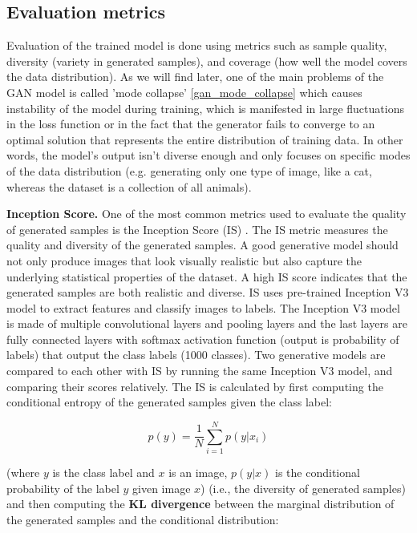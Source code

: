 \subsection{Evaluation metrics}

Evaluation of the trained model is done using metrics such as sample quality, diversity (variety in generated samples), and coverage (how well the model covers the data distribution). As we will find later, one of the main problems of the GAN model is called 'mode collapse' \ref{gan_mode_collapse} which causes instability of the model during training, which is manifested in large fluctuations in the loss function or in the fact that the generator fails to converge to an optimal solution that represents the entire distribution of training data. In other words, the model's output isn't diverse enough and only focuses on specific modes of the data distribution (e.g. generating only one type of image, like a cat, whereas the dataset is a collection of all animals).





\textbf{Inception Score.} One of the most common metrics used to evaluate the quality of generated samples is the Inception Score (IS) \cite{is_score}. The IS metric measures the quality and diversity of the generated samples. A good generative model should not only produce images that look visually realistic but also capture the underlying statistical properties of the dataset. A high IS score indicates that the generated samples are both realistic and diverse. IS uses pre-trained Inception V3 model \cite{inception_v3_model} to extract features and classify images to labels. The Inception V3 model is made of multiple convolutional layers and pooling layers and the last layers are fully connected layers with softmax activation function (output is probability of labels) that output the class labels (1000 classes). Two generative models are compared to each other with IS by running the same Inception V3 model, and comparing their scores relatively. The IS is calculated by first computing the conditional entropy of the generated samples given the class label: 

\[
    p(y) = \frac{1}{N} \sum_{i=1}^{N} p(y|x_i)
\] 

(where $y$ is the class label and $x$ is an image, $p(y|x)$ is the conditional probability of the label $y$ given image $x$) (i.e., the diversity of generated samples) and then computing the \textbf{KL divergence} between the marginal distribution of the generated samples and the conditional distribution:

